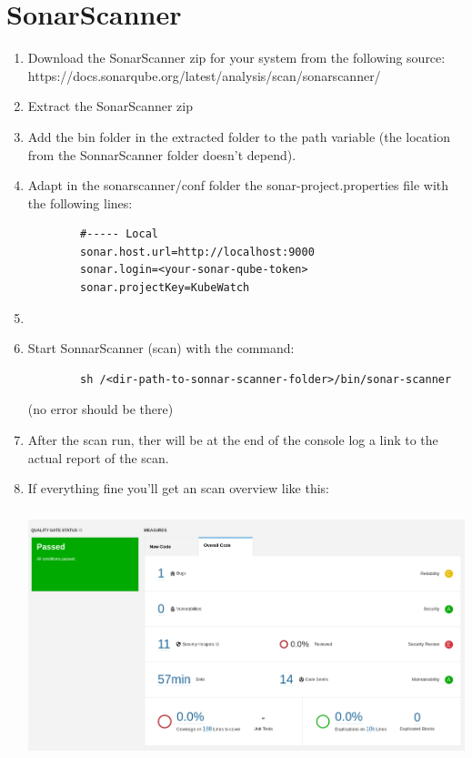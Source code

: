 \section{SonarScanner}
\begin{enumerate}
    \item Download the SonarScanner zip for your system from the following source: https://docs.sonarqube.org/latest/analysis/scan/sonarscanner/
    \item Extract the SonarScanner zip
    \item Add the bin folder in the extracted folder to the path variable (the location from the SonnarScanner folder doesn't depend).
    \item Adapt in the sonarscanner/conf folder the sonar-project.properties file with the following lines: \begin{lstlisting}
        #----- Local
        sonar.host.url=http://localhost:9000
        sonar.login=<your-sonar-qube-token>
        sonar.projectKey=KubeWatch
    \end{lstlisting}
    \item 
    \item Start SonnarScanner (scan) with the command: \begin{lstlisting}
        sh /<dir-path-to-sonnar-scanner-folder>/bin/sonar-scanner
    \end{lstlisting}
    (no error should be there)
    \item After the scan run, ther will be at the end of the console log a link to the actual report of the scan.
    \item If everything fine you'll get an scan overview like this: \newline
    \includegraphics[height=8cm]{resources/scan.png}
\end{enumerate}

